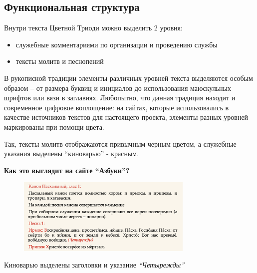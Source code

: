 \documentclass[
  letterpaper,
]{book}
\begin{document}

\hypertarget{sec-func_structure}{%
\subsection{Функциональная структура}\label{sec-func_structure}}

Внутри текста Цветной Триоди можно выделить 2 уровня:

\begin{itemize}
\item
  служебные комментариями по организации и проведению службы
\item
  тексты молитв и песнопений
\end{itemize}

В рукописной традиции элементы различных уровней текста выделяются
особым образом -- от размера буквиц и инициалов до использования
маюскульных шрифтов или вязи в заглавиях. Любопытно, что данная традиция
находит и современное цифровое воплощение: на сайтах, которые
использовались в качестве источников текстов для настоящего проекта,
элементы разных уровней маркированы при помощи цвета.

Так, тексты молитв отображаются привычным черным цветом, а служебные
указания выделены ``киноварью'' - красным.

\begin{tcolorbox}[enhanced jigsaw, toprule=.15mm, colframe=quarto-callout-tip-color-frame, colback=white, left=2mm, arc=.35mm, leftrule=.75mm, bottomrule=.15mm, rightrule=.15mm, opacityback=0, breakable]

\textbf{Как это выглядит на сайте ``Азбуки''?}\vspace{2mm}

\begin{figure}[H]

{\centering \includegraphics[width=0.75\textwidth,height=\textheight]{images/pascha_canon_csl.png}

}

\end{figure}

Киноварью выделены заголовки и указание \emph{``Четырежды''}

\end{tcolorbox}
\end{document}
